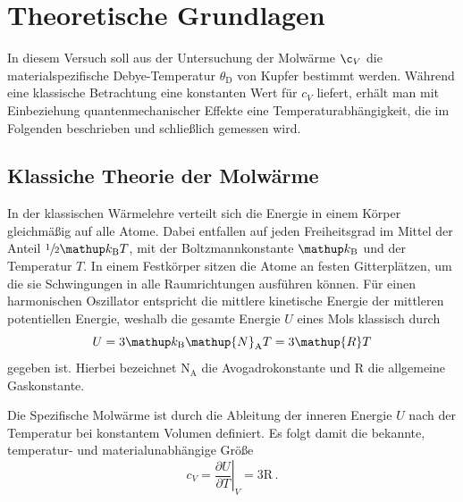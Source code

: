 \section{Theoretische Grundlagen}
\label{sec:theorie}
In diesem Versuch soll aus der Untersuchung der Molwärme $\c_V$
die materialspezifische Debye-Temperatur $\theta_\text{D}$ von Kupfer
bestimmt werden.
Während eine klassische Betrachtung eine konstanten Wert für $c_V$
liefert, erhält man mit Einbeziehung quantenmechanischer Effekte eine
Temperaturabhängigkeit, die im Folgenden beschrieben und schließlich 
gemessen wird.

\subsection{Klassiche Theorie der Molwärme}
\label{subsec:klassisch}
In der klassischen Wärmelehre verteilt sich die Energie in einem Körper
gleichmäßig auf alle Atome. Dabei entfallen auf jeden Freiheitsgrad im Mittel
der Anteil $\sfrac{1}{2}\kb T$, mit der Boltzmannkonstante $\kb$ und der
Temperatur $T$.
In einem Festkörper sitzen die Atome an festen Gitterplätzen, um die sie
Schwingungen in alle Raumrichtungen ausführen können. Für einen harmonischen
Oszillator entspricht die mittlere kinetische Energie der mittleren
potentiellen Energie, weshalb die gesamte Energie $U$ eines Mols klassisch
durch
\begin{equation}
    \label{eqn:innere_energie}
    U = 3 \kb \mathup{N}_\text{A} T = 3\mathup{R}T
\end{equation}
gegeben ist. Hierbei bezeichnet $\mathup{N}_\text{A}$ die Avogadrokonstante
und $\mathup{R}$ die allgemeine Gaskonstante.

Die Spezifische Molwärme ist durch die Ableitung der inneren Energie $U$ nach
der Temperatur bei konstantem Volumen definiert. Es folgt damit
die bekannte, temperatur- und materialunabhängige Größe
\begin{equation}
    \label{eqn:cv_klassisch}
    c_V = \left.\frac{\partial U}{\partial T}\right|_V = 3 \mathup{R}\,.
\end{equation}

